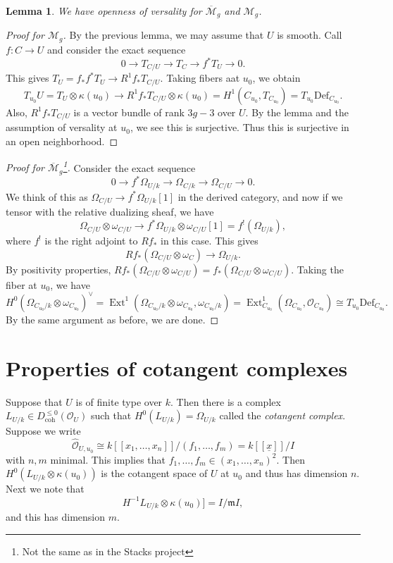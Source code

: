 \documentclass[leqno, openany]{memoir}
\newtheorem{lem}[thm]{Lemma}
\theoremstyle{definition}
\theoremstyle{remark}
\theoremstyle{plain}
\theoremstyle{definition}
\theoremstyle{remark}
\newcommand{\mc}[1]{\mathcal{#1}}
\newcommand{\mf}[1]{\mathfrak{#1}}
\newcommand{\mr}[1]{\mathrm{#1}}
\newcommand{\ol}[1]{\overline{#1}}
\newcommand{\ul}[1]{\underline{#1}}
\newcommand{\wh}[1]{\widehat{#1}}
\DeclareMathOperator{\Ext}{Ext}
\begin{document}
\begin{lem}
    We have openness of versality for $\ol{\mc{M}}_g$ and $\mc{M}_g$.
\end{lem}

\begin{proof}[Proof for $\mc{M}_g$]
    By the previous lemma, we may assume that $U$ is smooth. Call $f \colon C \to U$ and consider the exact sequence
    \[ 0 \to T_{C/U} \to T_C \to f^* T_U \to 0. \]
    This gives $T_U = f_* f^* T_U \to R^1 f_* T_{C/U}$. Taking fibers aat $u_0$, we obtain
    \[ T_{u_0} U = T_U \otimes \kappa(u_0) \to R^1 f_* T_{C/U} \otimes \kappa(u_0) = H^1(C_{u_0}, T_{C_{u_0}}) = T_{u_0} \mr{Def}_{C_{u_0}}. \]
    Also, $R^1 f_* T_{C/U}$ is a vector bundle of rank $3g-3$ over $U$. By the lemma and the assumption of versality at $u_0$, we see this is surjective. Thus this is surjective in an open neighborhood.
\end{proof}

\begin{proof}[Proof for $\ol{\mc{M}}_g$\footnote{Not the same as in the Stacks project}]
    Consider the exact sequence
    \[ 0 \to f^* \Omega_{U/k} \to \Omega_{C/k} \to \Omega_{C/U} \to 0. \]
    We think of this as $\Omega_{C/U} \to f^* \Omega_{U/k}[1]$ in the derived category, and now if we tensor with the relative dualizing sheaf, we have
    \[ \Omega_{C/U} \otimes \omega_{C/U} \to f^* \Omega_{U/k} \otimes \omega_{C/U}[1] = f^!(\Omega_{U/k}), \]
    where $f^!$ is the right adjoint to $Rf_*$ in this case. This gives
    \[ Rf_* (\Omega_{C/U} \otimes \omega_C) \to \Omega_{U/k}. \]
    By positivity properties, $Rf_* (\Omega_{C/U} \otimes \omega_{C/U}) = f_* (\Omega_{C/U} \otimes \omega_{C/U})$. Taking the fiber at $u_0$, we have
    \[ H^0(\Omega_{C_{u_0}/k} \otimes \omega_{C_{u_0}})^{\vee} = \Ext^1(\Omega_{C_{u_0}/k} \otimes \omega_{C_{u_0}}, \omega_{C_{u_0}/k}) = \Ext^1_{C_{u_0}}(\Omega_{C_{u_0}}, \mc{O}_{C_{u_0}}) \cong T_{u_0} \mr{Def}_{C_{u_0}}. \]
    By the same argument as before, we are done.
\end{proof}

\section{Properties of cotangent complexes}%
\label{sec:properties_of_cotangent_complexes}

Suppose that $U$ is of finite type over $k$. Then there is a complex $L_{U/k} \in D^{\leq 0}_{\mr{coh}}(\mc{O}_U)$ such that $H^0(L_{U/k}) = \Omega_{U/k}$ called the \textit{cotangent complex}. Suppose we write
\[ \wh{\mc{O}}_{U, u_0} \cong k[[x_1, \ldots, x_n]]/ (f_1, \ldots, f_m) = k[[\ul{x}]]/I \]
with $n, m$ minimal. This implies that $f_1, \ldots, f_m \in (x_1, \ldots, x_n)^2$. Then $H^0(L_{U/k} \otimes \kappa(u_0))$ is the cotangent space of $U$ at $u_0$ and thus has dimension $n$. Next we note that
\[ H^{-1} L_{U/k} \otimes \kappa(u_0)] = I/\mf{m} I, \]
and this has dimension $m$.
\end{document}
